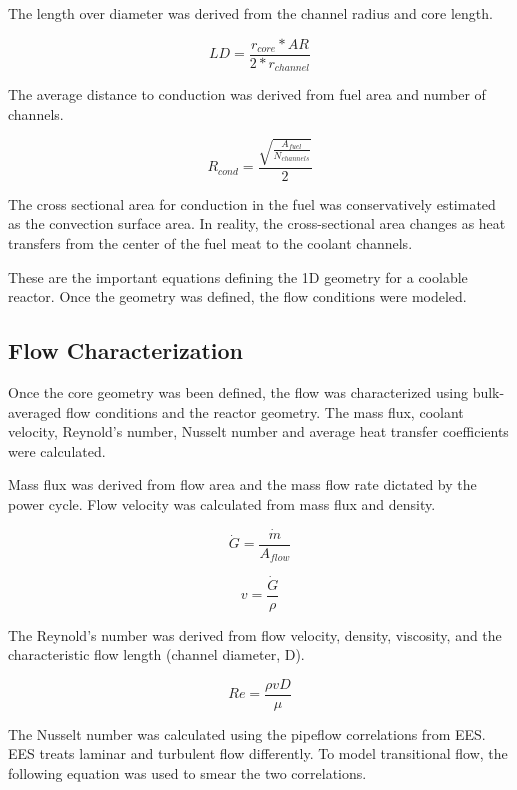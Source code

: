 The length over diameter was derived from the channel radius and core length.

\begin{equation}
    LD = \frac{r_{core}*AR}{2*r_{channel}}
\end{equation}

The average distance to conduction was derived from fuel area and number of
channels.

\begin{equation}
    R_{cond} = \frac{\sqrt{\frac{A_{fuel}}{N_{channels}}}}{2}
    \label{r_cond}
\end{equation}

The cross sectional area for conduction in the fuel was conservatively estimated
as the convection surface area. In reality, the cross-sectional area changes as
heat transfers from the center of the fuel meat to the coolant channels.

These are the important equations defining the 1D geometry for a coolable
reactor. Once the geometry was defined, the flow conditions were modeled.

\subsection{Flow Characterization}

Once the core geometry was been defined, the flow was characterized using
bulk-averaged flow conditions and the reactor geometry. The mass flux, coolant
velocity, Reynold's number, Nusselt number and average heat transfer
coefficients were calculated.

Mass flux was derived from flow area and the mass flow rate dictated by the power
cycle. Flow velocity was calculated from mass flux and density.

\begin{equation}
    \dot{G} = \frac{\dot{m}}{A_{flow}}
\end{equation}

\begin{equation}
    v = \frac{\dot{G}}{\rho}
\end{equation}

The Reynold's number was derived from flow velocity, density, viscosity, and the
characteristic flow length (channel diameter, D).

\begin{equation}
    Re = \frac{\rho v D}{\mu}
\end{equation}

The Nusselt number was calculated using the pipeflow correlations from EES. EES
treats laminar and turbulent flow differently. To model transitional flow, the
following equation was used to smear the two correlations.

